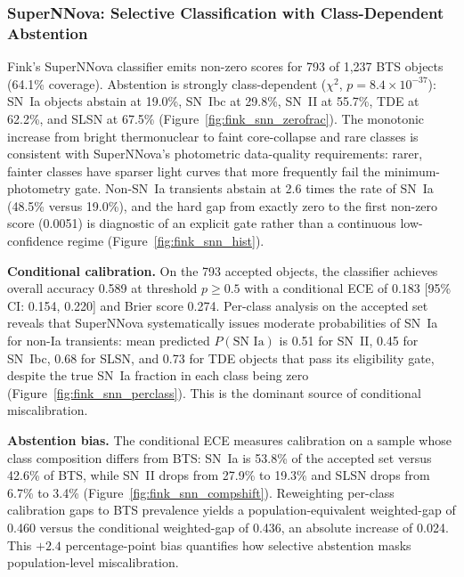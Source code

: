 \documentclass[a4paper,fleqn,usenatbib]{mnras}
\begin{document}
\subsubsection{SuperNNova: Selective Classification with Class-Dependent Abstention} \label{sec:fink_snn}

Fink's SuperNNova classifier \citep{moller2020} emits non-zero scores for 793 of 1,237 BTS objects (64.1\% coverage). Abstention is strongly class-dependent ($\chi^2$, $p = 8.4 \times 10^{-37}$): SN~Ia objects abstain at 19.0\%, SN~Ibc at 29.8\%, SN~II at 55.7\%, TDE at 62.2\%, and SLSN at 67.5\% (Figure~\ref{fig:fink_snn_zerofrac}). The monotonic increase from bright thermonuclear to faint core-collapse and rare classes is consistent with SuperNNova's photometric data-quality requirements: rarer, fainter classes have sparser light curves that more frequently fail the minimum-photometry gate. Non-SN~Ia transients abstain at 2.6 times the rate of SN~Ia (48.5\% versus 19.0\%), and the hard gap from exactly zero to the first non-zero score (0.0051) is diagnostic of an explicit gate rather than a continuous low-confidence regime (Figure~\ref{fig:fink_snn_hist}).

\textbf{Conditional calibration.} On the 793 accepted objects, the classifier achieves overall accuracy 0.589 at threshold $p \ge 0.5$ with a conditional ECE of 0.183 [95\% CI: 0.154, 0.220] and Brier score 0.274. Per-class analysis on the accepted set reveals that SuperNNova systematically issues moderate probabilities of SN~Ia for non-Ia transients: mean predicted $P(\text{SN~Ia})$ is 0.51 for SN~II, 0.45 for SN~Ibc, 0.68 for SLSN, and 0.73 for TDE objects that pass its eligibility gate, despite the true SN~Ia fraction in each class being zero (Figure~\ref{fig:fink_snn_perclass}). This is the dominant source of conditional miscalibration.

\textbf{Abstention bias.} The conditional ECE measures calibration on a sample whose class composition differs from BTS: SN~Ia is 53.8\% of the accepted set versus 42.6\% of BTS, while SN~II drops from 27.9\% to 19.3\% and SLSN drops from 6.7\% to 3.4\% (Figure~\ref{fig:fink_snn_compshift}). Reweighting per-class calibration gaps to BTS prevalence yields a population-equivalent weighted-gap of 0.460 versus the conditional weighted-gap of 0.436, an absolute increase of 0.024. This $+2.4$ percentage-point bias quantifies how selective abstention masks population-level miscalibration.
\end{document}
